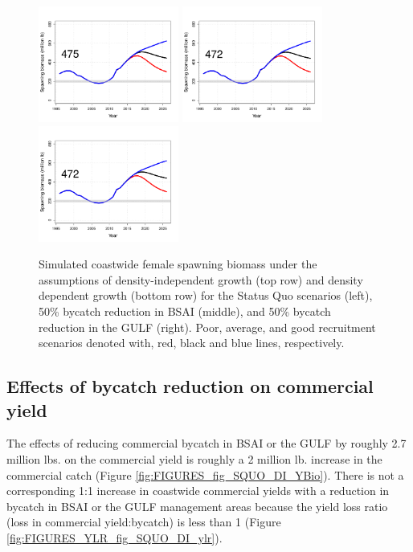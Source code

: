 \begin{figure}[htbp]
		\includegraphics[height=1.5in]{../FIGURES/fig_SQUO_DD_SBio.pdf}
		\includegraphics[height=1.5in]{../FIGURES/fig_BSAI_DD_SBio.pdf}
		\includegraphics[height=1.5in]{../FIGURES/fig_GULF_DD_SBio.pdf}
	\caption{Simulated coastwide female spawning biomass under the assumptions of density-independent growth (top row) and density dependent growth (bottom row) for the Status Quo scenarios (left), 50\% bycatch reduction in BSAI (middle), and 50\% bycatch reduction in the GULF (right).  Poor, average, and good recruitment scenarios denoted with, red, black and blue lines, respectively.}
	\label{fig:FIGURES_fig_SQUO_DI_SBio}
\end{figure}


\subsection{Effects of bycatch reduction on commercial yield} %
\label{sub:effects_of_bycatch_reduction_on_commercial_yield}
The effects of reducing commercial bycatch in BSAI or the GULF by roughly 2.7 million lbs. on the commercial yield is roughly a 2 million lb. increase in the commercial catch (Figure \ref{fig:FIGURES_fig_SQUO_DI_YBio}).  There is not a corresponding 1:1 increase in coastwide commercial yields with a reduction in bycatch in BSAI or the GULF management areas because the yield loss ratio (loss in commercial yield:bycatch) is less than 1 (Figure \ref{fig:FIGURES_YLR_fig_SQUO_DI_ylr}).


